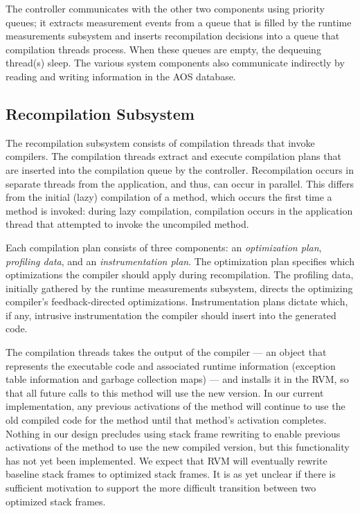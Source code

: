 The controller communicates with the other two components using
priority queues; it extracts measurement events from a queue that is
filled by the runtime measurements subsystem and inserts recompilation
decisions into a queue that compilation threads process.  When
these queues are empty, the dequeuing thread(s) sleep.  The various
system components also communicate 
indirectly by reading and writing information in the AOS database.

\subsection{Recompilation Subsystem}\label{sec:arch:comp}
The recompilation subsystem consists of compilation threads that
invoke compilers.
The compilation threads extract and execute compilation plans
that are inserted into the compilation queue by the controller. 
Recompilation occurs in separate threads from the application, and thus, 
can occur in parallel. 
This differs from the initial (lazy) compilation of a method, 
which occurs the first time a method is invoked:
during lazy compilation, compilation occurs in the application 
thread that attempted to invoke the uncompiled method.

Each compilation plan consists of three components: an {\em optimization
plan\/}, {\em profiling data\/}, and an {\em instrumentation plan\/}.
The optimization plan specifies which optimizations the compiler
should apply during recompilation.  
The profiling data, initially gathered by the runtime measurements subsystem, 
directs the optimizing compiler's feedback-directed optimizations.  
Instrumentation plans dictate which, if any, intrusive instrumentation the compiler 
should insert into the generated code. 

The compilation threads takes the output of the compiler --- an
object that represents the executable code and associated runtime
information (exception table information and garbage collection maps) ---
and installs it in the RVM, so that all future calls to this method
will use the new version.  In our current implementation, any previous
activations of the method will continue to use the old compiled
code for the method until that method's activation completes.  Nothing
in our design precludes using stack frame rewriting to enable previous
activations of the method to use the new compiled version, but this
functionality has not yet been implemented.  We expect that RVM will
eventually rewrite baseline stack frames to optimized stack frames. 
It is as yet unclear if there is sufficient motivation to support
the more difficult transition between two optimized stack frames. 


